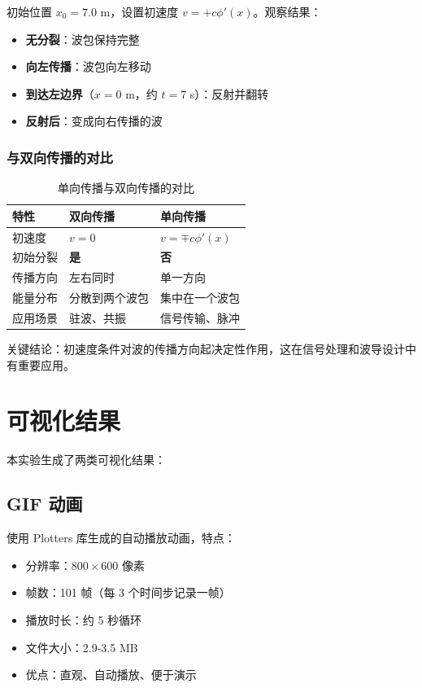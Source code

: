 \documentclass[12pt,a4paper]{article}
\begin{document}
初始位置 $x_0 = 7.0$ m，设置初速度 $v = +c\phi'(x)$。观察结果：
\begin{itemize}
    \item \textbf{无分裂}：波包保持完整
    \item \textbf{向左传播}：波包向左移动
    \item \textbf{到达左边界}（$x = 0$ m，约 $t = 7$ s）：反射并翻转
    \item \textbf{反射后}：变成向右传播的波
\end{itemize}

\subsubsection{与双向传播的对比}

\begin{table}[H]
\centering
\caption{单向传播与双向传播的对比}
\begin{tabular}{lll}
\toprule
特性 & 双向传播 & 单向传播 \\
\midrule
初速度 & $v = 0$ & $v = \mp c\phi'(x)$ \\
初始分裂 & \textbf{是} & \textbf{否} \\
传播方向 & 左右同时 & 单一方向 \\
能量分布 & 分散到两个波包 & 集中在一个波包 \\
应用场景 & 驻波、共振 & 信号传输、脉冲 \\
\bottomrule
\end{tabular}
\end{table}

关键结论：初速度条件对波的传播方向起决定性作用，这在信号处理和波导设计中有重要应用。

\section{可视化结果}

本实验生成了两类可视化结果：

\subsection{GIF 动画}

使用 Plotters 库生成的自动播放动画，特点：
\begin{itemize}
    \item 分辨率：$800 \times 600$ 像素
    \item 帧数：101 帧（每 3 个时间步记录一帧）
    \item 播放时长：约 5 秒循环
    \item 文件大小：2.9-3.5 MB
    \item 优点：直观、自动播放、便于演示
\end{itemize}
\end{document}
